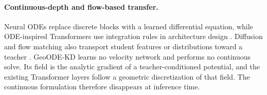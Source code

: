 \paragraph{Continuous-depth and flow-based transfer.}
Neural ODEs replace discrete blocks with a learned differential equation, while
ODE-inspired Transformers use integration rules in architecture design
\citep{chen2018neuralode,li2022odetransformer}. Diffusion and flow matching also
transport student features or distributions toward a teacher
\citep{huang2023diffkd,lipman2023flow,chen2024riemannian,shao2024fmkt}.
GeoODE-KD learns no velocity network and performs no continuous solve. Its field
is the analytic gradient of a teacher-conditioned potential, and the existing
Transformer layers follow a geometric discretization of that field. The
continuous formulation therefore disappears at inference time.
